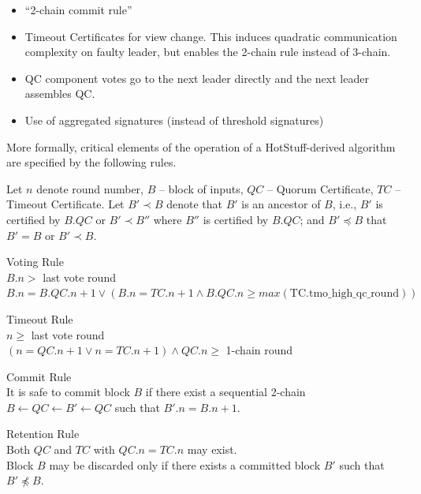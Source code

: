 \begin{itemize}
  \item ``2-chain commit rule''
  \item Timeout Certificates for view change. This induces quadratic communication complexity on faulty leader, but enables the 2-chain rule instead of 3-chain.
  \item QC component votes go to the next leader directly and the next leader assembles QC.
  \item Use of aggregated signatures (instead of threshold signatures)
\end{itemize}

More formally, critical elements of the operation of a HotStuff-derived algorithm are specified by the following rules.

Let $n$ denote round number, $B$ -- block of inputs, $QC$ -- Quorum Certificate, $TC$ -- Timeout Certificate. Let $B' \prec B$ denote that $B'$ is an ancestor of $B$, i.e., $B'$ is certified by $B.QC$ or $B' \prec B''$ where $B''$ is certified by $B.QC$; and $B' \preceq B$ that $B' = B$ or $B' \prec B$.

\begin{ruledef}{Voting Rule} \\
  $B.n > $ last vote round \\
  $B.n = B.QC.n + 1 \lor (B.n = TC.n + 1 \land B.QC.n \ge max(\text{TC.tmo\_high\_qc\_round}))$
\end{ruledef}

\begin{ruledef}{Timeout Rule} \\
    $n \ge $ last vote round \\
    $(n = QC.n + 1 \lor n = TC.n + 1) \land QC.n \ge $ 1-chain round
\end{ruledef}

\begin{ruledef}{Commit Rule} \\
    It is safe to commit block $B$ if there exist a sequential 2-chain $B \leftarrow QC \leftarrow B' \leftarrow QC$ such that $B'.n = B.n + 1$.
\end{ruledef}

\begin{ruledef}{Retention Rule} \\
    Both $QC$ and $TC$ with $QC.n = TC.n$ may exist. \\
    Block $B$ may be discarded only if there exists a committed block $B'$ such that $B' \not\preceq B$.
\end{ruledef}


